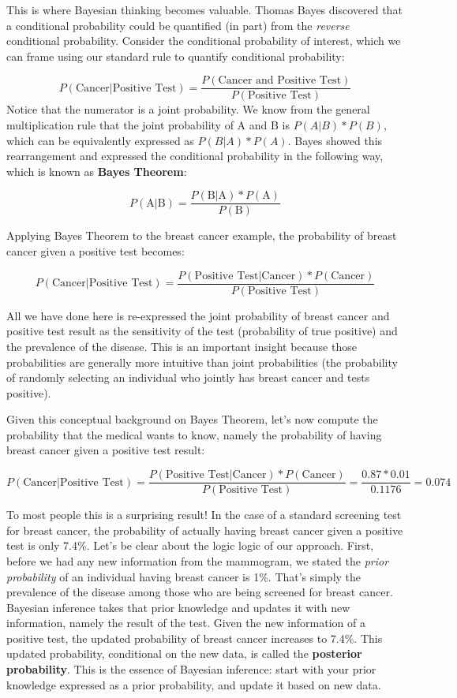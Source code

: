 \documentclass[
]{book}
\begin{document}
This is where Bayesian thinking becomes valuable. Thomas Bayes
discovered that a conditional probability could be quantified (in part)
from the \emph{reverse} conditional probability. Consider the conditional
probability of interest, which we can frame using our standard rule to
quantify conditional probability:

\[
P(\text{Cancer}|\text{Positive Test}) = \frac{P(\text{Cancer and Positive Test})}{P(\text{Positive Test})}
\] Notice that the numerator is a joint probability. We know from the
general multiplication rule that the joint probability of A and B is
\(P(A|B)*P(B)\), which can be equivalently expressed as \(P(B|A)*P(A)\).
Bayes showed this rearrangement and expressed the conditional
probability in the following way, which is known as \textbf{Bayes Theorem}:

\[
P(\text{A}|\text{B}) = \frac{P(\text{B|A})*P(\text{A})}{P(\text{B})}
\]

Applying Bayes Theorem to the breast cancer example, the probability
of breast cancer given a positive test becomes:

\[
P(\text{Cancer}|\text{Positive Test}) = \frac{P(\text{Positive Test|Cancer})*P(\text{Cancer})}{P(\text{Positive Test})}
\]

All we have done here is re-expressed the joint probability of breast
cancer and positive test result as the sensitivity of the test
(probability of true positive) and the prevalence of the disease. This
is an important insight because those probabilities are generally more
intuitive than joint probabilities (the probability of randomly
selecting an individual who jointly has breast cancer and tests
positive).

Given this conceptual background on Bayes Theorem, let's now compute the
probability that the medical wants to know, namely the probability of
having breast cancer given a positive test result:

\[
P(\text{Cancer}|\text{Positive Test}) = \frac{P(\text{Positive Test|Cancer})*P(\text{Cancer})}{P(\text{Positive Test})}=\frac{0.87*0.01}{0.1176}=0.074
\]

To most people this is a surprising result! In the case of a standard
screening test for breast cancer, the probability of actually having
breast cancer given a positive test is only 7.4\%. Let's be clear about
the logic logic of our approach. First, before we had any new
information from the mammogram, we stated the \emph{prior probability} of an
individual having breast cancer is 1\%. That's simply the prevalence of
the disease among those who are being screened for breast cancer.
Bayesian inference takes that prior knowledge and updates it with new
information, namely the result of the test. Given the new information of
a positive test, the updated probability of breast cancer increases to
7.4\%. This updated probability, conditional on the new data, is called
the \textbf{posterior probability}. This is the essence of Bayesian
inference: start with your prior knowledge expressed as a prior
probability, and update it based on new data.
\end{document}
